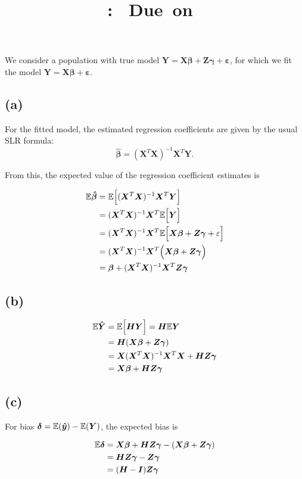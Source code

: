 \documentclass{article}
\title{
\vspace{2in}
\textmd{\textbf{\hmwkClass:\ \hmwkTitle}}
\normalsize\vspace{0.1in}\small{Due\ on\ \hmwkDueDate}
}
\begin{document}

\begin{homeworkProblem}[Problem 1]
We consider a population with true model $\bm Y = \bm{X \beta} + \bm{Z \gamma}
+ \bm \varepsilon$, for which we fit the model $\bm Y = \bm{X \beta} + \bm \varepsilon$.

\subsection*{(a)}
For the fitted model, the estimated regression coefficients are given by the 
usual SLR formula:
\[\bm{\hat\beta} = (\bm{X}^T\bm X)^{-1}\bm X^T\bm Y.\]

From this, the expected value of the regression coefficient estimates is

\begin{align*}
  \mathbb{E} \bm{\hat\beta} &= \mathbb{E}\Big[(\bm{X}^T\bm X)^{-1}\bm X^T\bm Y\Big]\\
  &= (\bm{X}^T\bm X)^{-1}\bm X^T\mathbb{E}\Big[\bm Y\Big]\\
  &= (\bm{X}^T\bm X)^{-1}\bm X^T \mathbb{E}\Big[\bm{X\beta} + \bm{Z\gamma} + \varepsilon\Big]\\
  &= (\bm{X}^T\bm X)^{-1}\bm X^T\Big(\bm{X\beta} + \bm{Z\gamma}\Big)\\
  &= \bm \beta + (\bm{X}^T\bm X)^{-1}\bm X^T\bm{Z\gamma}
\end{align*}

\subsection*{(b)}

\begin{align*}
  \mathbb{E} \bm{\hat Y} &= \mathbb{E} \Big[\bm H \bm Y\Big] = \bm H \mathbb{E} \bm Y\\
  &= \bm H(\bm{X \beta} + \bm{Z\gamma})\\
  &= \bm X(\bm{X}^T\bm X)^{-1}\bm X^T \bm X + \bm{HZ\gamma}\\
  &= \bm{X\beta} + \bm{HZ\gamma}
\end{align*}

\subsection*{(c)}
For bias $\bm\delta = \mathbb{E}(\bm{\hat y}) - \mathbb{E}(\bm Y)$, the expected bias is

\begin{align*}
  \mathbb{E} \bm\delta &= \bm{X\beta} + \bm{HZ\gamma} - (\bm{X\beta} + \bm{Z\gamma})\\
  &= \bm{HZ\gamma} - \bm{Z\gamma}\\
  &= (\bm{H} - \bm{I})\bm{Z\gamma}
\end{align*}  
\end{homeworkProblem}
\end{document}
